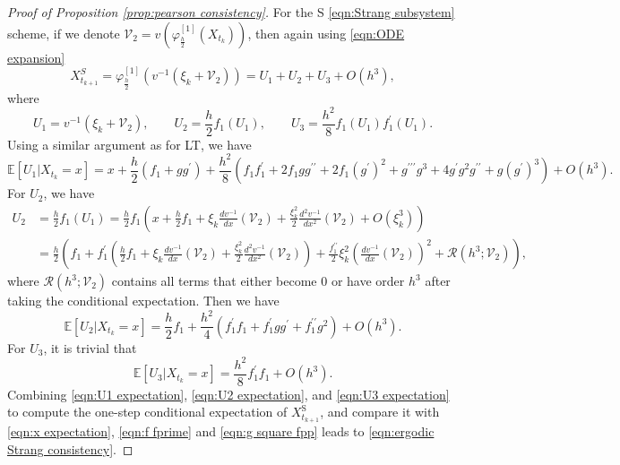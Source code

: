 \documentclass[a4paper,12pt]{article}
\numberwithin{equation}{section}
\theoremstyle{plain}
\theoremstyle{definition}
\begin{document}
\begin{appendix}
\begin{proof}[Proof of Proposition \ref{prop:pearson consistency}]
For the S \eqref{eqn:Strang subsystem} scheme, if we denote $\mathcal{V}_2=v(\varphi_{\frac{h}{2}}^{[1]}(X_{t_k}))$, then again using \eqref{eqn:ODE expansion}
\begin{equation*}
    X^{S}_{t_{k+1}}=\varphi_{\frac{h}{2}}^{[1]}(v^{-1}(\xi_k+\mathcal{V}_2))=U_1+U_2+U_3+O(h^3),
\end{equation*}
where
\begin{equation*}
    U_1=v^{-1}(\xi_k+\mathcal{V}_2),\qquad U_2=\frac{h}{2}f_1(U_1),\qquad U_3=\frac{h^2}{8}f_1(U_1)f^{\prime}_1(U_1).
\end{equation*}
Using a similar argument as for LT, we have
\begin{equation}\label{eqn:U1 expectation}
    \mathbb{E}[U_1|X_{t_k}=x]=x+\frac{h}{2}(f_1+gg^{\prime})+\frac{h^2}{8}(f_1f_1^{\prime}+2f_1gg^{\prime\prime}+2f_1(g^{\prime})^2+g^{\prime\prime\prime}g^3+4g^{\prime}g^2g^{\prime\prime}+g(g^{\prime})^3)+O(h^3).
\end{equation}
For $U_2$, we have
\begin{align*}
    U_2&=\frac{h}{2}f_1(U_1)=\frac{h}{2}f_1\left(x+\frac{h}{2}f_1+\xi_k\frac{dv^{-1}}{dx}(\mathcal{V}_2)+\frac{\xi_k^2}{2}\frac{d^2v^{-1}}{dx^2}(\mathcal{V}_2)+O(\xi_k^3)\right)\\
    &=\frac{h}{2}\left(f_1+f^{\prime}_1(\frac{h}{2}f_1+\xi_k\frac{dv^{-1}}{dx}(\mathcal{V}_2)+\frac{\xi_k^2}{2}\frac{d^2v^{-1}}{dx^2}(\mathcal{V}_2))+\frac{f^{\prime\prime}_1}{2}\xi_k^2(\frac{dv^{-1}}{dx}(\mathcal{V}_2))^2+\mathcal{R}(
h^3;\mathcal{V}_2)\right),
\end{align*}
where $\mathcal{R}(h^3;\mathcal{V}_2)$ contains all terms that either become $0$ or have order $h^3$ after taking the conditional expectation. Then we have
\begin{equation}\label{eqn:U2 expectation}
    \mathbb{E}[U_2|X_{t_k}=x]=\frac{h}{2}f_1+\frac{h^2}{4}(f_1^{\prime}f_1+f_1^{\prime}gg^{\prime}+f_1^{\prime\prime}g^2)+O(h^3).
\end{equation}
For $U_3$, it is trivial that
\begin{equation}\label{eqn:U3 expectation}
    \mathbb{E}[U_3|X_{t_k}=x]=\frac{h^2}{8}f_1^{\prime}f_1+O(h^3).
\end{equation}
Combining \eqref{eqn:U1 expectation}, \eqref{eqn:U2 expectation}, and  \eqref{eqn:U3 expectation} to compute the one-step conditional expectation of $X^{\textrm{S}}_{t_{k+1}}$, and compare it with \eqref{eqn:x expectation}, \eqref{eqn:f fprime} and \eqref{eqn:g square fpp} leads to \eqref{eqn:ergodic Strang consistency}.
\end{proof}

\end{appendix}
\end{document}
